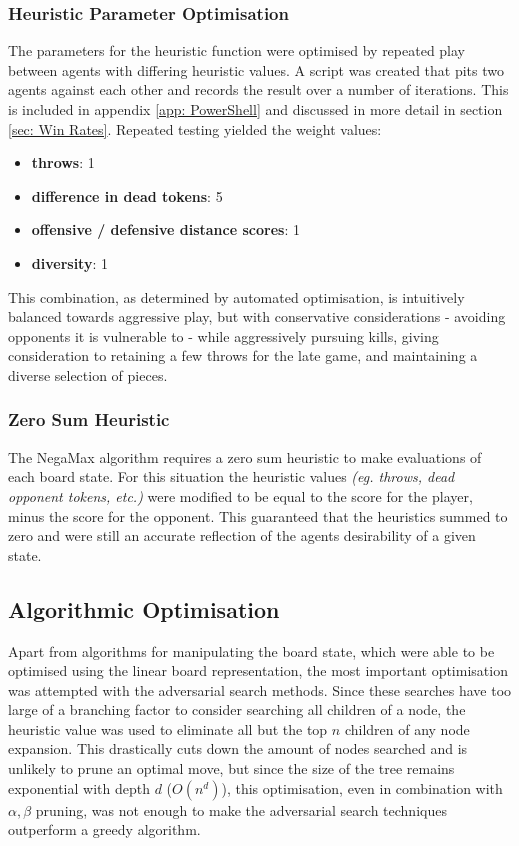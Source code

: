 \documentclass{article}
\begin{document}
\subsubsection{Heuristic Parameter Optimisation}
\label{sec: Heuristic Optimisation}
The parameters for the heuristic function were optimised by repeated play between agents with differing heuristic values. A script was created that pits two agents against each other and records the result over a number of iterations. This is included in appendix \ref{app: PowerShell} and discussed in more detail in section \ref{sec: Win Rates}. Repeated testing yielded the weight values:
\begin{itemize}
    \item \textbf{throws}: 1
    \item \textbf{difference in dead tokens}: 5
    \item \textbf{offensive / defensive distance scores}: 1
    \item \textbf{diversity}: 1
\end{itemize}
This combination, as determined by automated optimisation, is intuitively balanced towards aggressive play, but with conservative considerations - avoiding opponents it is vulnerable to - while aggressively pursuing kills, giving consideration to retaining a few throws for the late game, and maintaining a diverse selection of pieces.
\subsubsection{Zero Sum Heuristic}
The NegaMax algorithm requires a zero sum heuristic to make evaluations of each board state. For this situation the heuristic values \textit{(eg. throws, dead opponent tokens, etc.)} were modified to be equal to the score for the player, minus the score for the opponent. This guaranteed that the heuristics summed to zero and were still an accurate reflection of the agents desirability of a given state.

\subsection{Algorithmic Optimisation}
Apart from algorithms for manipulating the board state, which were able to be optimised using the linear board representation, the most important optimisation was attempted with the adversarial search methods. Since these searches have too large of a branching factor to consider searching all children of a node, the heuristic value was used to eliminate all but the top $n$ children of any node expansion. This drastically cuts down the amount of nodes searched and is unlikely to prune an optimal move, but since the size of the tree remains exponential with depth $d$ ($O(n^d)$), this optimisation, even in combination with $\alpha, \beta$ pruning, was not enough to make the adversarial search techniques outperform a greedy algorithm.
\end{document}
